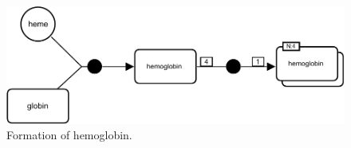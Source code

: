 \begin{figure}[H]
  \centering
  \includegraphics[scale = 0.8]{examples/association-multimerisation}
  \caption{Formation of hemoglobin.}
  \label{fig:assoc-multi}
\end{figure}

